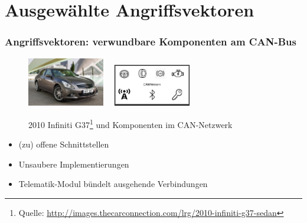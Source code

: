 \documentclass[t]{beamer}
\begin{document}
\section{Ausgewählte Angriffsvektoren}
\begin{frame}
	\frametitle{Angriffsvektoren: verwundbare Komponenten am CAN-Bus}
    \begin{center}
    	\begin{figure}
			\includegraphics[width=0.3\textwidth]{pic/remote_attack_images-026.jpg} \ \
			\includegraphics[width=0.3\textwidth]{pic/remote_attack_images-027.jpg}
      	  	\caption[2010 Infiniti G37 (Sedan)]{2010 Infiniti G37\footnote{Quelle: \href{http://images.thecarconnection.com/lrg/2010-infiniti-g37-sedan}{http://images.thecarconnection.com/lrg/2010-infiniti-g37-sedan}} und Komponenten im CAN-Netzwerk \cite{MiV14}}
		\end{figure}
	\end{center}
	\begin{itemize}
		\item (zu) offene Schnittstellen
  	    \item Unsaubere Implementierungen
        \item Telematik-Modul bündelt ausgehende Verbindungen
	\end{itemize}
\end{frame}

%
\end{document}
